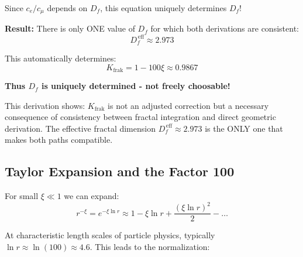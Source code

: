 \begin{tcolorbox}[colback=red!5!white,colframe=red!75!black,title={Unique Determination of $K_{\text{frak}}$ and $D_f$}]
		Since $c_e/c_\mu$ depends on $D_f$, this equation uniquely determines $D_f$!
		
		\textbf{Result:} There is only ONE value of $D_f$ for which both derivations are consistent:
		\begin{equation}
			D_f^{\,\text{eff}} \approx 2.973
		\end{equation}
		
		This automatically determines:
		\begin{equation}
			K_{\text{frak}} = 1 - 100\xi \approx 0.9867
		\end{equation}
		
		\textbf{Thus $D_f$ is uniquely determined - not freely choosable!}
	\end{tcolorbox}
	
	This derivation shows: $K_{\text{frak}}$ is not an adjusted correction but a necessary consequence of consistency between fractal integration and direct geometric derivation. The effective fractal dimension $D_f^{\,\text{eff}} \approx 2.973$ is the ONLY one that makes both paths compatible.
	
	\subsection{Taylor Expansion and the Factor 100}
	
	For small $\xi \ll 1$ we can expand:
	\begin{equation}
		r^{-\xi} = e^{-\xi \ln r} \approx 1 - \xi \ln r + \frac{(\xi \ln r)^2}{2} - \ldots
		\label{eq:taylor_expansion}
	\end{equation}
	
	At characteristic length scales of particle physics, typically $\ln r \approx \ln(100) \approx 4.6$. This leads to the normalization:
	
